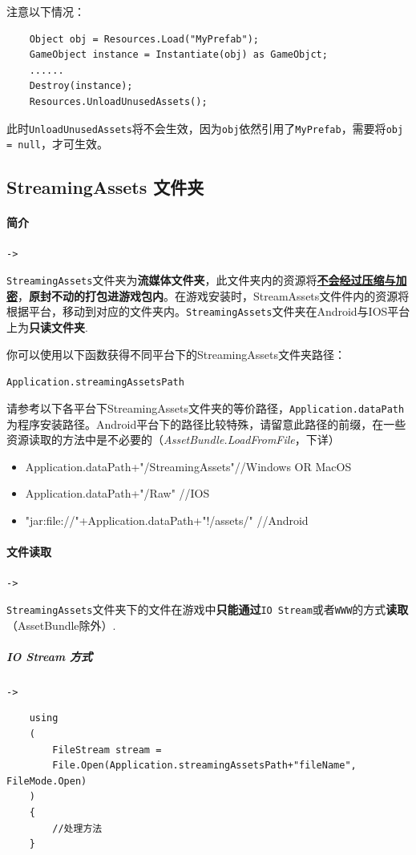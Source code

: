 \documentclass[UTF8,a4paper,12pt]{ctexbook}
\begin{document}
				注意以下情况：
					\begin{lstlisting}
	Object obj = Resources.Load("MyPrefab"); 			
	GameObject instance = Instantiate(obj) as GameObjct; 
	...... 
	Destroy(instance); 
	Resources.UnloadUnusedAssets(); 
					\end{lstlisting}
					
				此时\verb|UnloadUnusedAssets|将不会生效，因为\verb|obj|依然引用了\verb|MyPrefab|，需要将\verb|obj = null|，才可生效。

		\subsection{StreamingAssets 文件夹}
			\paragraph{简介}\verb|->|
			
				\verb|StreamingAssets|文件夹为\textbf{流媒体文件夹}，此文件夹内的资源将\underline{\textbf{不会经过压缩与加密}}，\textbf{原封不动的打包进游戏包内}。在游戏安装时，StreamAssets文件件内的资源将根据平台，移动到对应的文件夹内。\verb|StreamingAssets|文件夹在Android与IOS平台上为\textbf{只读文件夹}. 
				
				你可以使用以下函数获得不同平台下的StreamingAssets文件夹路径：
				
					\verb|Application.streamingAssetsPath| 
				
				 请参考以下各平台下StreamingAssets文件夹的等价路径，\verb|Application.dataPath|为程序安装路径。Android平台下的路径比较特殊，请留意此路径的前缀，在一些资源读取的方法中是不必要的（\textit{AssetBundle.LoadFromFile}，下详）
				
					\begin{itemize}
						\item Application.dataPath+"/StreamingAssets"//Windows OR MacOS
						\item Application.dataPath+"/Raw" //IOS
						\item "jar:file://"+Application.dataPath+"!/assets/" //Android 
					\end{itemize}
				 
			\paragraph{文件读取}\verb|->|
				
				\verb|StreamingAssets|文件夹下的文件在游戏中\textbf{只能通过}\verb|IO Stream|或者\verb|WWW|的方式\textbf{读取}（AssetBundle除外）.
				\subparagraph{IO Stream 方式}\verb|->|
					\begin{lstlisting}
	using
	(
		FileStream stream = 
		File.Open(Application.streamingAssetsPath+"fileName", FileMode.Open)
	) 
	{ 
		//处理方法 
	} 
					\end{lstlisting}
				
\end{document}
